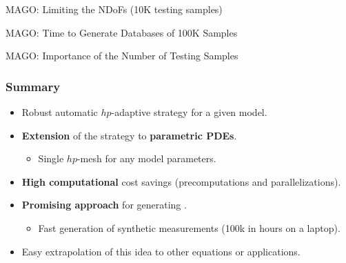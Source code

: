 \documentclass[10pt,aspectratio=149]{beamer}
\begin{document}
\begin{frame}{MAGO: Limiting the NDoFs (10K testing samples)}
\end{frame}
\begin{frame}{MAGO: Time to Generate Databases of 100K Samples}
\end{frame}
\begin{frame}{MAGO: Importance of the Number of Testing Samples}
\end{frame}
\begin{frame}[c]
	\frametitle{Summary}
	\vspace{5mm}
	\begin{itemize}
		\item Robust automatic $hp$-adaptive strategy for a given model.
		\vspace{7mm}
		\item \textbf{Extension} of the strategy to \textbf{parametric PDEs}.
		\vspace{3mm}
		\begin{itemize}
			\item Single $hp$-mesh for any model parameters.
		\end{itemize}
		\vspace{7mm}
		\item \textbf{High computational} cost savings (precomputations and parallelizations).
		\vspace{7mm}
		\item \textbf{Promising approach} for generating .
		\vspace{3mm}
		\begin{itemize}
			\item Fast generation of synthetic measurements (100k in hours on a laptop).
		\end{itemize}
		\vspace{7mm}
		\item Easy extrapolation of this idea to other equations or applications.
	\end{itemize}
\end{frame}
\end{document}
